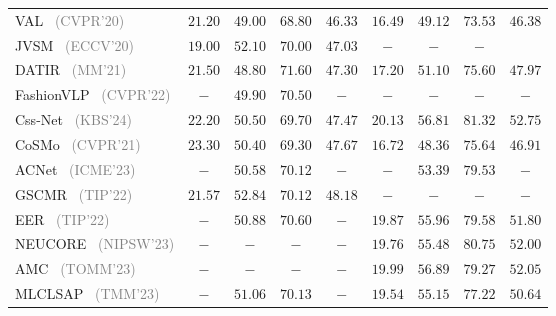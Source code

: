 \begin{table*}
\begin{tabular}{l|ccc|c|ccc|c}
    VAL~\cite{chen2020val} \footnotesize{\textcolor{gray}{(CVPR'20)}} & $21.20$ & $49.00$ & $68.80$ &$46.33$ & $16.49$ & $49.12$ & $73.53$ &$46.38$\\
    JVSM~\cite{chen2020jvsm} \footnotesize{\textcolor{gray}{(ECCV'20)}} & $19.00$ & $52.10$ & $70.00$ &$47.03$ &$-$ &$-$ & $-$& \\
    DATIR~\cite{gu2021datir} \footnotesize{\textcolor{gray}{(MM'21)}} & $21.50$ & $48.80$ & $71.60$ &$47.30$ & $17.20$ & $51.10$ & $75.60$ & $47.97$ \\
    FashionVLP~\cite{goenka2022fashionvlp} \footnotesize{\textcolor{gray}{(CVPR'22)}} & $-$ & $49.90$ & $70.50$ &$-$ &$-$ &$-$ & $-$&$-$\\
    Css-Net~\cite{zhang2024cssnet} \footnotesize{\textcolor{gray}{(KBS'24)}} & $22.20$ & $50.50$ & $69.70$ &$47.47$ & $20.13$ & $56.81$ & $81.32$ & $52.75$ \\
    CoSMo~\cite{lee2021cosmo} \footnotesize{\textcolor{gray}{(CVPR'21)}} & $23.30$ & $50.40$ & $69.30$ &$47.67$ & $16.72$ & $48.36$ & $75.64$ & $46.91$ \\
    ACNet~\cite{li2023acnet} \footnotesize{\textcolor{gray}{(ICME'23)}} & $-$ & $50.58$ & $70.12$ &$-$ & $-$ & $53.39$ & $79.53$ & $-$ \\
    GSCMR~\cite{zhang2021GSCMR} \footnotesize{\textcolor{gray}{(TIP'22)}} & $21.57$ & $52.84$ & $70.12$ &$48.18$ &$-$ &$-$ & $-$&$-$\\
    EER~\cite{zhang2022eer} \footnotesize{\textcolor{gray}{(TIP'22)}} & $-$ & $50.88$ & $70.60$ &$-$ & $19.87$ & $55.96$ & $79.58$ & $51.80$ \\
    NEUCORE~\cite{zhao2024neucore} \footnotesize{\textcolor{gray}{(NIPSW'23)}} &$-$ &$-$ & $-$&$-$& $19.76$ & $55.48$ & $80.75$ & $52.00$ \\
    AMC~\cite{zhu2023amc} \footnotesize{\textcolor{gray}{(TOMM'23)}}  &$-$ &$-$ & $-$&$-$& $19.99$ & $56.89$ & $79.27$ & $52.05$ \\
    MLCLSAP~\cite{zhang2023MLCLSAP} \footnotesize{\textcolor{gray}{(TMM'23)}} & $-$ & $51.06$ & $70.13$ &$-$ & $19.54$ & $55.15$ & $77.22$ & $50.64$ \\

\end{tabular}
\end{table*}
